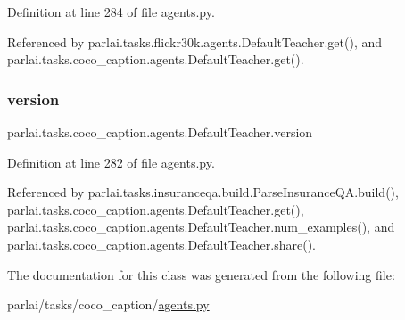 Definition at line 284 of file agents.\+py.



Referenced by parlai.\+tasks.\+flickr30k.\+agents.\+Default\+Teacher.\+get(), and parlai.\+tasks.\+coco\+\_\+caption.\+agents.\+Default\+Teacher.\+get().

\mbox{\label{classparlai_1_1tasks_1_1coco__caption_1_1agents_1_1DefaultTeacher_a5945ea0eff083c797fa85d1174c1a2e3}} 
\subsubsection{\texorpdfstring{version}{version}}
{\footnotesize\ttfamily parlai.\+tasks.\+coco\+\_\+caption.\+agents.\+Default\+Teacher.\+version}



Definition at line 282 of file agents.\+py.



Referenced by parlai.\+tasks.\+insuranceqa.\+build.\+Parse\+Insurance\+Q\+A.\+build(), parlai.\+tasks.\+coco\+\_\+caption.\+agents.\+Default\+Teacher.\+get(), parlai.\+tasks.\+coco\+\_\+caption.\+agents.\+Default\+Teacher.\+num\+\_\+examples(), and parlai.\+tasks.\+coco\+\_\+caption.\+agents.\+Default\+Teacher.\+share().



The documentation for this class was generated from the following file\+:\begin{DoxyCompactItemize}
\item 
parlai/tasks/coco\+\_\+caption/\hyperlink{parlai_2tasks_2coco__caption_2agents_8py}{agents.\+py}\end{DoxyCompactItemize}
